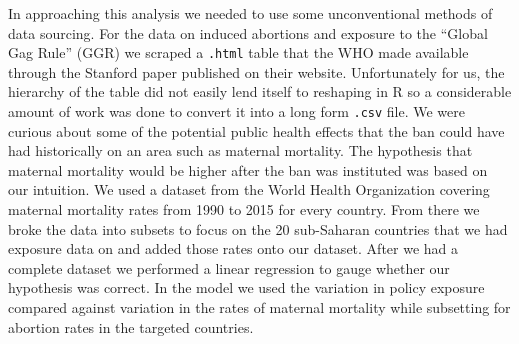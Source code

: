 \documentclass[11pt,]{article}
\begin{document}
In approaching this analysis we needed to use some unconventional
methods of data sourcing. For the data on induced abortions and exposure
to the ``Global Gag Rule'' (GGR) we scraped a \texttt{.html} table that
the WHO made available through the Stanford paper published on their
website. Unfortunately for us, the hierarchy of the table did not easily
lend itself to reshaping in R so a considerable amount of work was done
to convert it into a long form \texttt{.csv} file. We were curious about
some of the potential public health effects that the ban could have had
historically on an area such as maternal mortality. The hypothesis that
maternal mortality would be higher after the ban was instituted was
based on our intuition. We used a dataset from the World Health
Organization covering maternal mortality rates from 1990 to 2015 for
every country. From there we broke the data into subsets to focus on the
20 sub-Saharan countries that we had exposure data on and added those
rates onto our dataset. After we had a complete dataset we performed a
linear regression to gauge whether our hypothesis was correct. In the
model we used the variation in policy exposure compared against
variation in the rates of maternal mortality while subsetting for
abortion rates in the targeted countries.
\end{document}
